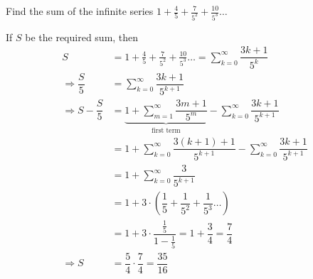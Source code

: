 
%
%
%
%
% 
% 

\question Find the sum of the infinite series $1 + \frac{4}{5} + \frac{7}{5^2} + \frac{10}{5^3}\ldots$

\insertQR{}

\ifprintanswers
\fi 

\begin{solution}
	If $S$ be the required sum, then
	\begin{align}
		S &= 1 + \frac{4}{5} + \frac{7}{5^2} + \frac{10}{5^3}\ldots = \sum_{k=0}^{\infty}\dfrac{3k+1}{5^k} \\
		\Rightarrow\dfrac{S}{5} &= \sum_{k=0}^{\infty}\dfrac{3k+1}{5^{k+1}} \\
		\Rightarrow S - \dfrac{S}{5} &= \underbrace{1 + \sum_{m=1}^{\infty}\dfrac{3m+1}{5^m}}
		_{\text{first term}}- \sum_{k=0}^{\infty}\dfrac{3k+1}{5^{k+1}} \\
		&= 1 + \sum_{k=0}^{\infty}\dfrac{3(k+1)+1}{5^{k+1}}-\sum_{k=0}^{\infty}\dfrac{3k+1}{5^{k+1}} \\
		&= 1 + \sum_{k=0}^{\infty}\dfrac{3}{5^{k+1}} \\
		&= 1 + 3\cdot\left( \dfrac{1}{5} + \dfrac{1}{5^2} + \dfrac{1}{5^3}\ldots \right) \\
		&= 1 + 3\cdot\dfrac{\frac{1}{5}}{1-\frac{1}{5}} = 1 + \dfrac{3}{4} = \dfrac{7}{4} \\
		\Rightarrow S &= \dfrac{5}{4}\cdot\dfrac{7}{4} = \dfrac{35}{16}
	\end{align}
\end{solution}
